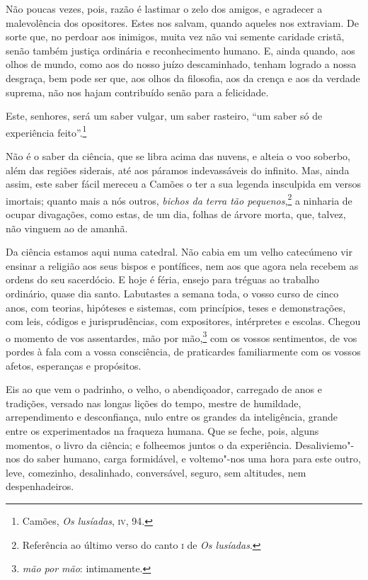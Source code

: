 Não poucas vezes, pois, razão é lastimar o zelo dos amigos, e
agradecer a malevolência dos opositores. Estes nos salvam, quando
aqueles nos extraviam. De sorte que, no perdoar aos inimigos, muita vez
não vai semente caridade cristã, senão também justiça ordinária e
reconhecimento humano. E, ainda quando, aos olhos de mundo, como aos do
nosso juízo descaminhado, tenham logrado a nossa desgraça, bem pode ser
que, aos olhos da filosofia, aos da crença e aos da verdade suprema,
não nos hajam contribuído senão para a felicidade.

Este, senhores, será um saber vulgar, um saber rasteiro,
``um saber só de experiência feito''.\footnote{ Camões,
\textit{Os lusíadas}, \textsc{iv}, 94.}


Não é o saber da ciência, que se libra acima das nuvens, e alteia
o voo soberbo, além das regiões siderais, até aos páramos indevassáveis
do infinito. Mas, ainda assim, este saber fácil mereceu a
Camões o ter a sua legenda insculpida
em versos imortais; quanto mais a nós outros, \textit{bichos da terra
tão pequenos},\footnote{Referência ao último verso do canto \textsc{i} de
\textit{Os lusíadas}.} a ninharia de ocupar divagações, como estas, de um
dia, folhas de árvore morta, que, talvez, não vinguem ao de amanhã.

Da ciência estamos aqui numa catedral. Não cabia em um velho
catecúmeno vir ensinar a religião aos seus bispos e pontífices, nem aos
que agora nela recebem as ordens do seu sacerdócio. E hoje é féria,
ensejo para tréguas ao trabalho ordinário, quase dia santo. Labutastes
a semana toda, o vosso curso de cinco anos, com teorias, hipóteses e
sistemas, com princípios, teses e demonstrações, com leis, códigos e
jurisprudências, com expositores, intérpretes e escolas. Chegou o
momento de vos assentardes, mão por mão,\footnote{ \textit{mão por mão}: 
intimamente.} com os vossos sentimentos, de vos
pordes à fala com a vossa consciência, de praticardes familiarmente com
os vossos afetos, esperanças e propósitos.

Eis ao que vem o padrinho, o velho, o abendiçoador, carregado de
anos e tradições, versado nas longas lições do tempo, mestre de
humildade, arrependimento e desconfiança, nulo entre os grandes da
inteligência, grande entre os experimentados na fraqueza humana. Que se
feche, pois, alguns momentos, o livro da ciência; e folheemos juntos o
da experiência. Desaliviemo"-nos do saber humano, carga formidável, e
voltemo"-nos uma hora para este outro, leve, comezinho, desalinhado,
conversável, seguro, sem altitudes, nem despenhadeiros.

